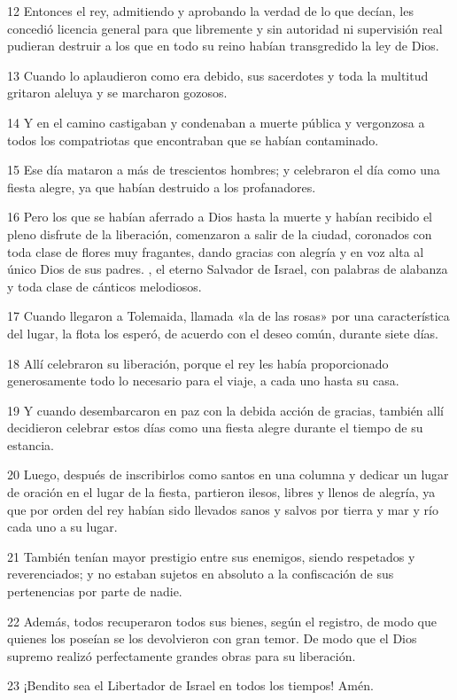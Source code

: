 \par 12 Entonces el rey, admitiendo y aprobando la verdad de lo que decían, les concedió licencia general para que libremente y sin autoridad ni supervisión real pudieran destruir a los que en todo su reino habían transgredido la ley de Dios.
\par 13 Cuando lo aplaudieron como era debido, sus sacerdotes y toda la multitud gritaron aleluya y se marcharon gozosos.
\par 14 Y en el camino castigaban y condenaban a muerte pública y vergonzosa a todos los compatriotas que encontraban que se habían contaminado.
\par 15 Ese día mataron a más de trescientos hombres; y celebraron el día como una fiesta alegre, ya que habían destruido a los profanadores.
\par 16 Pero los que se habían aferrado a Dios hasta la muerte y habían recibido el pleno disfrute de la liberación, comenzaron a salir de la ciudad, coronados con toda clase de flores muy fragantes, dando gracias con alegría y en voz alta al único Dios de sus padres. , el eterno Salvador de Israel, con palabras de alabanza y toda clase de cánticos melodiosos.
\par 17 Cuando llegaron a Tolemaida, llamada «la de las rosas» por una característica del lugar, la flota los esperó, de acuerdo con el deseo común, durante siete días.
\par 18 Allí celebraron su liberación, porque el rey les había proporcionado generosamente todo lo necesario para el viaje, a cada uno hasta su casa.
\par 19 Y cuando desembarcaron en paz con la debida acción de gracias, también allí decidieron celebrar estos días como una fiesta alegre durante el tiempo de su estancia.
\par 20 Luego, después de inscribirlos como santos en una columna y dedicar un lugar de oración en el lugar de la fiesta, partieron ilesos, libres y llenos de alegría, ya que por orden del rey habían sido llevados sanos y salvos por tierra y mar y río cada uno a su lugar.
\par 21 También tenían mayor prestigio entre sus enemigos, siendo respetados y reverenciados; y no estaban sujetos en absoluto a la confiscación de sus pertenencias por parte de nadie.
\par 22 Además, todos recuperaron todos sus bienes, según el registro, de modo que quienes los poseían se los devolvieron con gran temor. De modo que el Dios supremo realizó perfectamente grandes obras para su liberación.
\par 23 ¡Bendito sea el Libertador de Israel en todos los tiempos! Amén.

